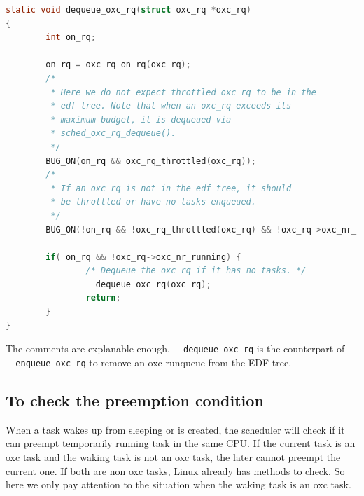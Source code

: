 \begin{lstlisting}[language=C,
		caption={To remove an ox container 
				from the EDF tree if necessary}]
static void dequeue_oxc_rq(struct oxc_rq *oxc_rq)
{
        int on_rq;

        on_rq = oxc_rq_on_rq(oxc_rq);
        /*
         * Here we do not expect throttled oxc_rq to be in the 
         * edf tree. Note that when an oxc_rq exceeds its 
         * maximum budget, it is dequeued via 
         * sched_oxc_rq_dequeue().
         */
        BUG_ON(on_rq && oxc_rq_throttled(oxc_rq));
        /* 
         * If an oxc_rq is not in the edf tree, it should 
         * be throttled or have no tasks enqueued.
         */
        BUG_ON(!on_rq && !oxc_rq_throttled(oxc_rq) && !oxc_rq->oxc_nr_running);

        if( on_rq && !oxc_rq->oxc_nr_running) {
                /* Dequeue the oxc_rq if it has no tasks. */
                __dequeue_oxc_rq(oxc_rq);
                return;
        }
}
\end{lstlisting}

The comments are explanable enough. \texttt{\_\_dequeue\_oxc\_rq} 
is the counterpart of \texttt{\_\_enqueue\_oxc\_rq} to remove an oxc
runqueue from the EDF tree.

\subsection{To check the preemption condition
			\label{sec:check_preempt_curr_oxc}}
When a task wakes up from sleeping or is created, the scheduler will check 
if it can preempt temporarily running task in the same CPU. If the current 
task is an oxc task and the waking task is not an oxc task, the later 
cannot preempt the current one. If both are non oxc tasks, Linux already 
has methods to check. So here we only pay attention to the situation
when the waking task is an oxc task.

